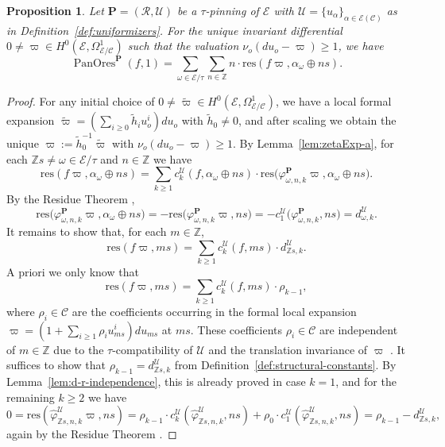 \documentclass[preprint,12pt]{elsarticle}
\numberwithin{equation}{section} %
\theoremstyle{theorem}
\newtheorem{proposition}[theorem]{Proposition}
\theoremstyle{definition}
\newcommand{\Ca}{\mathcal{C}} %
\newcommand{\ec}{\mathcal{E}} %
\newcommand{\idec}{{o}} %
\newcommand{\orbita}{{\ec/\tau}} %
\newcommand{\Z}{\mathbb{Z}} %
\DeclareMathOperator{\pano}{PanOres}
\begin{document}
\begin{proposition} \label{prop:diff-pano}
    Let $\mathbf{P}=(\mathcal{R},\mathcal{U})$ be a $\tau$-pinning of $\ec$ with $\mathcal{U}=\{u_\alpha\}_{\alpha\in\ec(\Ca)}$ as in Definition~\ref{def:uniformizers}. For the unique invariant differential $0\neq\varpi\in H^0(\ec,\Omega^1_{\ec/\Ca})$ such that the valuation $\nu_\idec(du_\idec-\varpi)\geq 1$, we have
    \[\pano^\mathbf{P}(f,1)=\sum_{\omega\in\orbita}\sum_{n\in\Z}n\cdot\mathrm{res}(f\varpi,\alpha_\omega\oplus ns).\]
\end{proposition}
\begin{proof}
    For any initial choice of $0\neq \tilde{\varpi}\in H^0(\ec,\Omega^1_{\ec/\Ca})$, we have a local formal expansion \mbox{$\tilde{\varpi}=\left(\sum_{i\geq 0}\tilde{h}_iu_\idec^i\right)du_\idec$} with $\tilde{h}_0\neq 0$, and after scaling we obtain the unique $\varpi:=\tilde{h}_0^{-1}\tilde{\varpi}$ with $\nu_\idec(du_\idec-\varpi)\geq 1$. By Lemma~\ref{lem:zetaExp-a}, for each $\Z s\neq\omega\in\orbita$ and $n\in\Z$ we have \[\mathrm{res}(f\varpi,\alpha_\omega\oplus ns)=\sum_{k\geq 1}c_k^\mathcal{U}(f,\alpha_\omega\oplus ns)\cdot\mathrm{res}\bigl(\varphi^\mathbf{P}_{\omega,n,k}\varpi,\alpha_\omega\oplus ns\bigr).\] By the Residue Theorem \cite[Thm.~III.7.14.2]{Hartshorne}, \[\mathrm{res}\bigl(\varphi^\mathbf{P}_{\omega,n,k}\varpi,\alpha_\omega\oplus ns\bigr)=-\mathrm{res}\bigl(\varphi^\mathbf{P}_{\omega,n,k}\varpi,ns\bigr)=-c_1^\mathcal{U}\bigl(\varphi^\mathbf{P}_{\omega,n,k},ns\bigr)=d^\mathcal{U}_{\omega,k}.\] It remains to show that, for each $m\in\Z$, \[\mathrm{res}(f\varpi, ms)=\sum_{k\geq 1}c_k^\mathcal{U}(f,ms)\cdot d^\mathcal{U}_{\Z s,k}.\] A priori we only know that \[\mathrm{res}(f\varpi,ms)=\sum_{k\geq 1}c_k^\mathcal{U}(f,ms)\cdot \rho_{k-1},\] where $\rho_i\in\Ca$ are the coefficients occurring in the formal local expansion \mbox{$\varpi=\left(1+\sum_{i\geq 1}\rho_iu_{ms}^i\right)du_{ms}$} at $ms$. These coefficients $\rho_i\in\Ca$ are independent of $m\in\Z$ due to the $\tau$-compatibility of $\mathcal{U}$ and the translation invariance of $\varpi$ \cite[Prop.~III.5.1]{SilvermanIntro}. It suffices to show that $\rho_{k-1}=d^\mathcal{U}_{\Z s,k}$ from Definition~\ref{def:structural-constants}. By Lemma~\ref{lem:d-r-independence}, this is already proved in case $k=1$, and for the remaining $k\geq 2$ we have \[0=\mathrm{res}(\hat{\varphi}^\mathcal{U}_{\Z s,n,k}\varpi,ns)=\rho_{k-1}\cdot c_k^\mathcal{U}(\hat{\varphi}^\mathcal{U}_{\Z s,n,k},ns)+\rho_0\cdot c_1^\mathcal{U}(\hat{\varphi}^\mathcal{U}_{\Z s,n,k},ns)=\rho_{k-1}-d^\mathcal{U}_{\Z s,k},\] again by the Residue Theorem \cite[Thm.~III.7.14.2]{Hartshorne}.
\end{proof}
\end{document}
